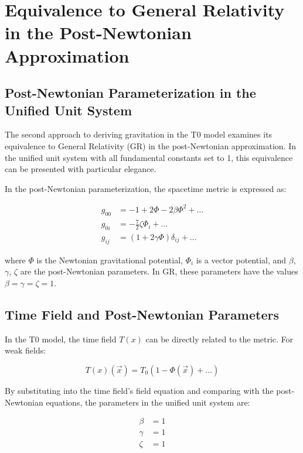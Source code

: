 \documentclass[12pt,a4paper]{article}
\newcommand{\Tfield}{T(x)}
\newcommand{\Tzero}{T_0}
\newcommand{\vecx}{\vec{x}}
\begin{document}
	\section{Equivalence to General Relativity in the Post-Newtonian Approximation}
	
	\subsection{Post-Newtonian Parameterization in the Unified Unit System}
	The second approach to deriving gravitation in the T0 model examines its equivalence to General Relativity (GR) in the post-Newtonian approximation. In the unified unit system with all fundamental constants set to 1, this equivalence can be presented with particular elegance.
	
	In the post-Newtonian parameterization, the spacetime metric is expressed as:
	
	\begin{align}
		g_{00} &= -1 + 2\Phi - 2\beta\Phi^2 + \dots \\
		g_{0i} &= -\frac{7}{2}\zeta \Phi_i + \dots \\
		g_{ij} &= (1 + 2\gamma\Phi)\delta_{ij} + \dots
	\end{align}
	
	where \(\Phi\) is the Newtonian gravitational potential, \(\Phi_i\) is a vector potential, and \(\beta\), \(\gamma\), \(\zeta\) are the post-Newtonian parameters. In GR, these parameters have the values \(\beta = \gamma = \zeta = 1\).
	
	\subsection{Time Field and Post-Newtonian Parameters}
	In the T0 model, the time field \(\Tfield\) can be directly related to the metric. For weak fields:
	
	\begin{equation}
		\Tfield(\vecx) = \Tzero(1 - \Phi(\vecx) + \dots)
	\end{equation}
	
	By substituting into the time field’s field equation and comparing with the post-Newtonian equations, the parameters in the unified unit system are:
	
	\begin{align}
		\beta &= 1 \\
		\gamma &= 1 \\
		\zeta &= 1
	\end{align}
	
\end{document}
